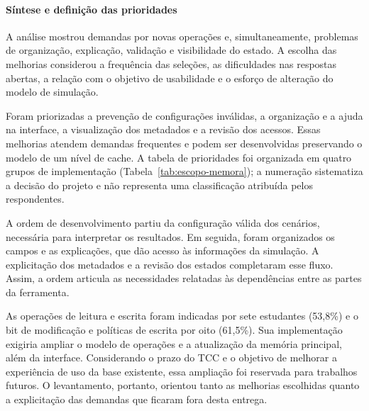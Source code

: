 \FloatBarrier
\paragraph*{Síntese e definição das prioridades}
A análise mostrou demandas por novas operações e, simultaneamente, problemas de organização, explicação, validação e visibilidade do estado. A escolha das melhorias considerou a frequência das seleções, as dificuldades nas respostas abertas, a relação com o objetivo de usabilidade e o esforço de alteração do modelo de simulação.


Foram priorizadas a prevenção de configurações inválidas, a organização e a ajuda na interface, a visualização dos metadados e a revisão dos acessos. Essas melhorias atendem demandas frequentes e podem ser desenvolvidas preservando o modelo de um nível de cache. A tabela de prioridades foi organizada em quatro grupos de implementação (Tabela~\ref{tab:escopo-memora}); a numeração sistematiza a decisão do projeto e não representa uma classificação atribuída pelos respondentes.

A ordem de desenvolvimento partiu da configuração válida dos cenários, necessária para interpretar os resultados. Em seguida, foram organizados os campos e as explicações, que dão acesso às informações da simulação. A explicitação dos metadados e a revisão dos estados completaram esse fluxo. Assim, a ordem articula as necessidades relatadas às dependências entre as partes da ferramenta.

As operações de leitura e escrita foram indicadas por sete estudantes (53,8\%) e o bit de modificação e políticas de escrita por oito (61,5\%). Sua implementação exigiria ampliar o modelo de operações e a atualização da memória principal, além da interface. Considerando o prazo do TCC e o objetivo de melhorar a experiência de uso da base existente, essa ampliação foi reservada para trabalhos futuros. O levantamento, portanto, orientou tanto as melhorias escolhidas quanto a explicitação das demandas que ficaram fora desta entrega.


